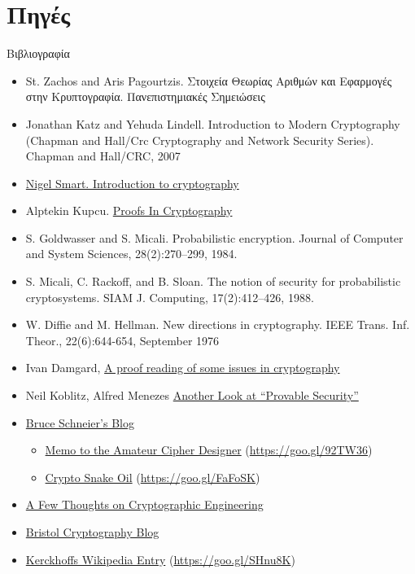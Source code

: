 \documentclass[handout]{beamer}
\begin{document}
\section{Πηγές}
\begin{frame}[allowframebreaks]{Βιβλιογραφία}
\begin{small}
\begin{itemize}
\item St. Zachos and Aris Pagourtzis. Στοιχεία Θεωρίας Αριθμών και Εφαρμογές στην Κρυπτογραφία. Πανεπιστημιακές Σημειώσεις
\item Jonathan Katz and Yehuda Lindell. Introduction to Modern Cryptography (Chapman and Hall/Crc Cryptography and Network Security Series). Chapman
and Hall/CRC, 2007
\item \href{http://goo.gl/b75I29}{Nigel Smart. Introduction to cryptography} 

\item Alptekin Kupcu. \href{https://goo.gl/l4GT2u}{Proofs In Cryptography}

\item S. Goldwasser and S. Micali. Probabilistic encryption. Journal of Computer and System Sciences, 28(2):270–299, 1984.
\item S. Micali, C. Rackoff, and B. Sloan. The notion of security for probabilistic cryptosystems. SIAM J. Computing, 17(2):412–426, 1988.

\framebreak

\item W. Diffie and M. Hellman. New directions in cryptography. IEEE Trans. Inf. Theor., 22(6):644-654, September 1976

\item Ivan Damgard, \href{http://goo.gl/mgAXC8}{A proof reading of some issues in cryptography}
\item Neil Koblitz, Alfred Menezes \href{https://goo.gl/GJNklR}{Another Look at “Provable Security”}



\item \href{https://www.schneier.com/}{Bruce Schneier's Blog}
\begin{itemize}
\item \href{https://goo.gl/92TW36}{Memo to the Amateur Cipher Designer} (\url{https://goo.gl/92TW36})
\item \href{https://goo.gl/FaFoSK}{Crypto Snake Oil} (\url{https://goo.gl/FaFoSK})
\end{itemize}
\item \href{http://blog.cryptographyengineering.com/}{A Few Thoughts on Cryptographic Engineering}
\item \href{http://goo.gl/whmmb9}{Bristol Cryptography Blog}

\item \href{https://goo.gl/SHnu8K}{Kerckhoffs Wikipedia Entry} (\url{https://goo.gl/SHnu8K})



\end{itemize}
\end{small}
\end{frame}

 
\end{document}
